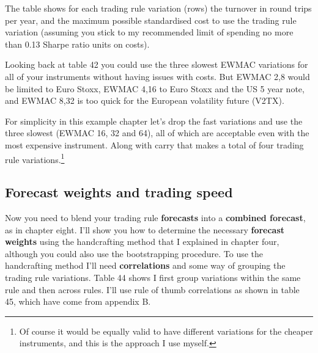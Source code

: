  

The table shows for each trading rule variation (rows) the turnover in round trips per year, and the maximum possible standardised cost to use the trading rule variation (assuming you stick to my recommended limit of spending no more than 0.13 Sharpe ratio units on costs).

Looking back at table 42 you could use the three slowest EWMAC variations for all of your instruments without having issues with costs. But EWMAC 2,8 would be limited to Euro Stoxx, EWMAC 4,16 to Euro Stoxx and the US 5 year note, and EWMAC 8,32 is too quick for the European volatility future (V2TX).

For simplicity in this example chapter let's drop the fast variations and use the three slowest (EWMAC 16, 32 and 64), all of which are acceptable even with the most expensive instrument. Along with carry that makes a total of four trading rule variations.\footnote{Of course it would be equally valid to have different variations for the cheaper instruments, and this is the approach I use myself.}

\subsection*{Forecast weights and trading speed}

Now you need to blend your trading rule \textbf{forecasts} into a \textbf{combined forecast}, as in chapter eight. I'll show you how to determine the necessary \textbf{forecast weights} using the handcrafting method that I explained in chapter four, although you could also use the bootstrapping procedure. To use the handcrafting method I'll need \textbf{correlations} and some way of grouping the trading rule variations. Table 44 shows I first group variations within the same rule and then across rules. I'll use rule of thumb correlations as shown in table 45, which have come from appendix B.

